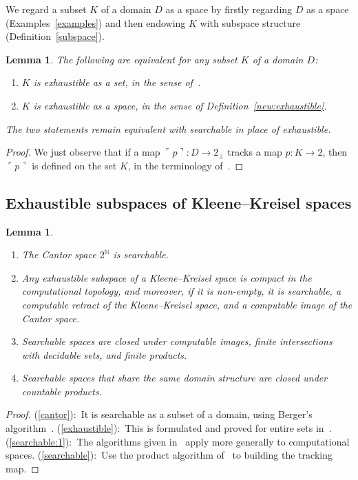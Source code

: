 \documentclass[10pt]{article}
\newcommand{\godel}[1]{\ulcorner #1 \urcorner}
\newtheorem{lemma}[cor]{Lemma}
\newcommand{\N}{\mathbb{N}}
\begin{document}
\medskip
\pagebreak[3]
We regard a subset $K$ of a domain $D$ as a space by firstly regarding
$D$ as a space (Examples~\ref{examples}) and then endowing
$K$ with subspace structure (Definition~\ref{subspace}).
\begin{lemma} 
The following are equivalent for any subset $K$ of a domain $D$:
\begin{enumerate}
  \item $K$ is exhaustible as a set, in the sense of~\cite{escardo:exhaustible}.
  \item $K$ is exhaustible as a space, in the sense of
    Definition~\ref{new:exhaustible}. 
\end{enumerate}
The two statements remain equivalent with \emph{searchable} in place
of \emph{exhaustible}. 
\end{lemma}
\begin{proof}
We just observe that if a
map $\godel{p} \colon D \to 2_{\bot}$ tracks a map $p \colon K \to 2$,
then $\godel{p}$ is defined on the set $K$, in the terminology
of~\cite{escardo:exhaustible}. 
\end{proof}
\subsection{Exhaustible subspaces of Kleene--Kreisel spaces}

\begin{lemma}\leavevmode
\begin{enumerate} 
\item \label{cantor} The Cantor space $2^\N$ is searchable.

\item \label{exhaustible} Any exhaustible subspace of a
  Kleene--Kreisel space is compact in the computational topology, and
  moreover, if it is non-empty, it is searchable, a computable retract
  of the Kleene--Kreisel space, and a computable image of the Cantor
  space.

\item \label{searchable:1} Searchable spaces are closed under
  computable images, finite intersections with decidable sets, and
  finite products.

\item \label{searchable}
Searchable spaces that share the same domain structure are closed
  under countable products.
\end{enumerate}
\end{lemma}
\begin{proof}
  (\ref{cantor}):~It is searchable as a subset of a domain, using
  Berger's algorithm~\cite{escardo:exhaustible}.
%
  (\ref{exhaustible}):~This is formulated and proved for entire sets
  in~\cite{escardo:exhaustible}.
%
  (\ref{searchable:1}):~The algorithms given
  in~\cite{escardo:exhaustible} apply more generally to computational
  spaces. 
%
  (\ref{searchable}):~Use the product algorithm
  of~\cite{escardo:exhaustible} to building the tracking map.
\end{proof}
\end{document}
